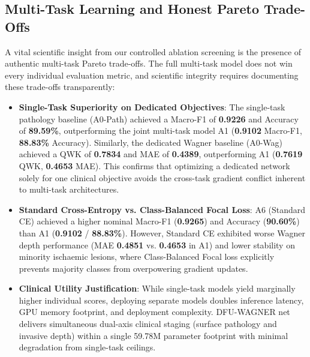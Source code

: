 \documentclass[journal]{IEEEtran}
\begin{document}
\subsection{Multi-Task Learning and Honest Pareto Trade-Offs}
A vital scientific insight from our controlled ablation screening is the presence of authentic multi-task Pareto trade-offs. The full multi-task model does not win every individual evaluation metric, and scientific integrity requires documenting these trade-offs transparently:
\begin{itemize}
    \item \textbf{Single-Task Superiority on Dedicated Objectives}: The single-task pathology baseline (A0-Path) achieved a Macro-F1 of \textbf{0.9226} and Accuracy of \textbf{89.59\%}, outperforming the joint multi-task model A1 (\textbf{0.9102} Macro-F1, \textbf{88.83\%} Accuracy). Similarly, the dedicated Wagner baseline (A0-Wag) achieved a QWK of \textbf{0.7834} and MAE of \textbf{0.4389}, outperforming A1 (\textbf{0.7619} QWK, \textbf{0.4653} MAE). This confirms that optimizing a dedicated network solely for one clinical objective avoids the cross-task gradient conflict inherent to multi-task architectures.
    \item \textbf{Standard Cross-Entropy vs. Class-Balanced Focal Loss}: A6 (Standard CE) achieved a higher nominal Macro-F1 (\textbf{0.9265}) and Accuracy (\textbf{90.60\%}) than A1 (\textbf{0.9102} / \textbf{88.83\%}). However, Standard CE exhibited worse Wagner depth performance (MAE \textbf{0.4851} vs. \textbf{0.4653} in A1) and lower stability on minority ischaemic lesions, where Class-Balanced Focal loss explicitly prevents majority classes from overpowering gradient updates.
    \item \textbf{Clinical Utility Justification}: While single-task models yield marginally higher individual scores, deploying separate models doubles inference latency, GPU memory footprint, and deployment complexity. DFU-WAGNER net delivers simultaneous dual-axis clinical staging (surface pathology and invasive depth) within a single 59.78M parameter footprint with minimal degradation from single-task ceilings.
\end{itemize}
\end{document}
